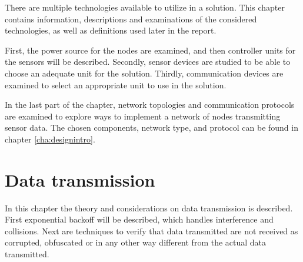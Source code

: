 \label{cha:technologies}
There are multiple technologies available to utilize in a solution. This chapter contains information, descriptions and examinations of the considered technologies, as well as definitions used later in the report.

First, the power source for the nodes are examined, and then controller units for the sensors will be described. Secondly, sensor devices are studied to be able to choose an adequate unit for the solution. Thirdly, communication devices are examined to select an appropriate unit to use in the solution. 

In the last part of the chapter, network topologies and communication protocols are examined to explore ways to implement a network of nodes transmitting sensor data. The chosen components, network type, and protocol can be found in chapter \ref{cha:designintro}.













\chapter{Data transmission}
In this chapter the theory and considerations on data transmission is described. First exponential backoff will be described, which handles interference and collisions. Next are techniques to verify that data transmitted are not received as corrupted, obfuscated or in any other way different from the actual data transmitted.




